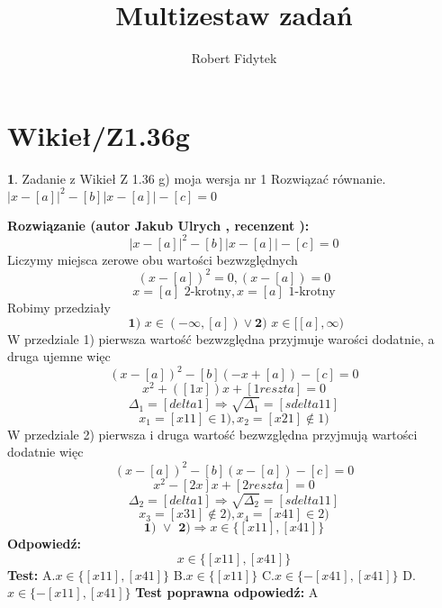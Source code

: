 \documentclass[12pt, a4paper]{article}
\title{Multizestaw zadań}
\author{Robert Fidytek}
\date{}
\theoremstyle{definition} %
\newtheorem{zad}{}
\newcommand{\kategoria}[1]{\section{#1}} %
\newcommand{\zadStart}[1]{\begin{zad}#1\newline} %
\newcommand{\zadStop}{\end{zad}}   %
\newcommand{\rozwStart}[2]{\noindent \textbf{Rozwiązanie (autor #1 , recenzent #2): }\newline} %
\newcommand{\rozwStop}{\newline}                                            %
\newcommand{\odpStart}{\noindent \textbf{Odpowiedź:}\newline}    %
\newcommand{\odpStop}{\newline}                                             %
\newcommand{\testStart}{\noindent \textbf{Test:}\newline} %
\newcommand{\testStop}{\newline} %
\newcommand{\kluczStart}{\noindent \textbf{Test poprawna odpowiedź:}\newline} %
\newcommand{\kluczStop}{\newline} %
\begin{document}
\maketitle


\kategoria{Wikieł/Z1.36g}
\zadStart{Zadanie z Wikieł Z 1.36 g) moja wersja nr 1}
Rozwiązać równanie. $|x-[a]|^{2}-[b]|x-[a]|-[c]=0$
\zadStop
\rozwStart{Jakub Ulrych}{}
$$|x-[a]|^{2}-[b]|x-[a]|-[c]=0$$
Liczymy miejsca zerowe obu wartości bezwzględnych
$$(x-[a])^{2}=0,(x-[a])=0$$
$$x=[a]\text{ 2-krotny},x=[a]\text{ 1-krotny}$$
Robimy przedziały
$$\textbf{ 1) }x\in(-\infty,[a])\vee\textbf{2) }x\in[[a],\infty)$$
W przedziale 1) pierwsza wartość bezwzględna przyjmuje warości dodatnie, a druga ujemne więc
$$(x-[a])^{2}-[b](-x+[a])-[c]=0$$
$$x^{2}+([1x])x+[1reszta]=0$$
$$\Delta_{1}=[delta1]\Rightarrow\sqrt{\Delta_{1}}=[sdelta11]$$
$$x_{1}=[x11]\in1),x_{2}=[x21]\notin1)$$
W przedziale 2) pierwsza i druga wartość bezwzględna przyjmują wartości dodatnie więc
$$(x-[a])^{2}-[b](x-[a])-[c]=0$$
$$x^{2}-[2x]x+[2reszta]=0$$
$$\Delta_{2}=[delta1]\Rightarrow\sqrt{\Delta_{2}}=[sdelta11]$$
$$x_{3}=[x31]\notin2),x_{4}=[x41]\in2)$$
$$\textbf{1) }\vee\textbf{ 2)}\Rightarrow x\in\{[x11],[x41]\}$$
\rozwStop
\odpStart
$$x\in\{[x11],[x41]\}$$
\odpStop
\testStart
A.$x\in\{[x11],[x41]\}$
B.$x\in\{[x11]\}$
C.$x\in\{-[x41],[x41]\}$
D.$x\in\{-[x11],[x41]\}$
\testStop
\kluczStart
A
\kluczStop
\end{document}
